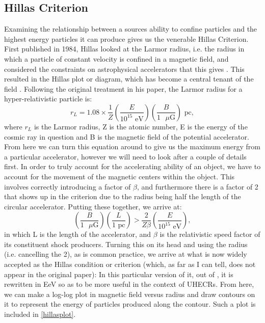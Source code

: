 \subsection{Hillas Criterion}
Examining the relationship between a sources ability to confine particles and the highest energy particles it can produce gives us the venerable Hillas Criterion. First published in 1984, Hillas looked at the Larmor radius, i.e. the radius in which a particle of constant velocity is confined in a magnetic field, and considered the constraints on astrophysical accelerators that this gives \cite{hillas}. This resulted in the Hillas plot or diagram, which has become a central tenant of the field \cite{stanev}. Following the original treatment in his paper, the Larmor radius for a hyper-relativistic particle is:
$$ r_L=1.08\times\frac{1}{Z}\left(\frac{E}{10^{15}\mbox{ eV}}\right)\left(\frac{B}{1\mbox{ $\mu$G}}\right)\mbox{ pc}, $$
where $r_L$ is the Larmor radius, Z is the atomic number, E is the energy of the cosmic ray in question and B is the magnetic field of the potential accelerator. From here we can turn this equation around to give us the maximum energy from a particular accelerator, however we will need to look after a couple of details first. In order to truly account for the accelerating ability of an object, we have to account for the movement of the magnetic centers within the object. This involves correctly introducing a factor of $\beta$, and furthermore there is a factor of 2 that shows up in the criterion due to the radius being half the length of the circular accelerator. Putting these together, we arrive at:
$$\left(\frac{B}{1\mbox{ $\mu$G}}\right) \left(\frac{L}{1\mbox{ pc}}\right)>\frac{2}{Z \beta}\left(\frac{E}{10^{15}\mbox{ eV}}\right),$$
in which L is the length of the accelerator, and $\beta$ is the relativistic speed factor of its constituent shock producers. Turning this on its head and using the radius (i.e. cancelling the 2), as is common practice, we arrive at what is now widely accepted as the Hillas condition or criterion (which, as far as I can tell, does not appear in the original paper):
In this particular version of it, out of \cite{stanev}, it is rewritten in EeV so as to be more useful in the context of UHECRs. From here, we can make a log-log plot in magnetic field versus radius and draw contours on it to represent the energy of particles produced along the contour. Such a plot is included in \autoref{hillasplot}.

